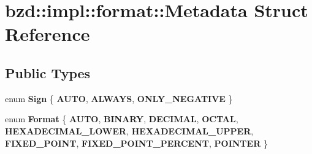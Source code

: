 \hypertarget{structbzd_1_1impl_1_1format_1_1Metadata}{}\section{bzd\+:\+:impl\+:\+:format\+:\+:Metadata Struct Reference}
\label{structbzd_1_1impl_1_1format_1_1Metadata}
\subsection*{Public Types}
\begin{DoxyCompactItemize}
\item 
\mbox{\label{structbzd_1_1impl_1_1format_1_1Metadata_aa52b9fd73d63e9029748a8051cff0911}} 
enum {\bfseries Sign} \{ {\bfseries A\+U\+TO}, 
{\bfseries A\+L\+W\+A\+YS}, 
{\bfseries O\+N\+L\+Y\+\_\+\+N\+E\+G\+A\+T\+I\+VE}
 \}
\item 
\mbox{\label{structbzd_1_1impl_1_1format_1_1Metadata_a9872db98097e96dafd4c321f872a0da2}} 
enum {\bfseries Format} \{ \newline
{\bfseries A\+U\+TO}, 
{\bfseries B\+I\+N\+A\+RY}, 
{\bfseries D\+E\+C\+I\+M\+AL}, 
{\bfseries O\+C\+T\+AL}, 
\newline
{\bfseries H\+E\+X\+A\+D\+E\+C\+I\+M\+A\+L\+\_\+\+L\+O\+W\+ER}, 
{\bfseries H\+E\+X\+A\+D\+E\+C\+I\+M\+A\+L\+\_\+\+U\+P\+P\+ER}, 
{\bfseries F\+I\+X\+E\+D\+\_\+\+P\+O\+I\+NT}, 
{\bfseries F\+I\+X\+E\+D\+\_\+\+P\+O\+I\+N\+T\+\_\+\+P\+E\+R\+C\+E\+NT}, 
\newline
{\bfseries P\+O\+I\+N\+T\+ER}
 \}
\end{DoxyCompactItemize}
